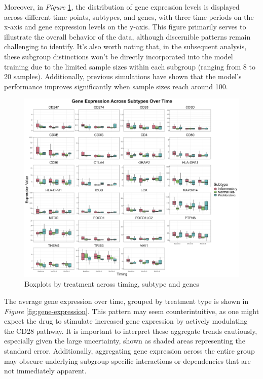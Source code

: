 \documentclass{report}
\begin{document}
Moreover, in \textit{Figure} \ref{fig:data-behaviour}, the distribution of gene expression levels is displayed across different time points, subtypes, and genes, with three time periods on the x-axis and gene expression levels on the y-axis. This figure primarily serves to illustrate the overall behavior of the data, although discernible patterns remain challenging to identify. It’s also worth noting that, in the subsequent analysis, these subgroup distinctions won’t be directly incorporated into the model training due to the limited sample sizes within each subgroup (ranging from 8 to 20 samples). Additionally, previous simulations have shown that the model’s performance improves significantly when sample sizes reach around 100. 

\begin{figure}[ht] 
	\centering
	\includegraphics[width=1.15\textwidth]{Figures/Application/descriptive_statistics/overall_boxes.png}
	\caption{Boxplots by treatment across timing, subtype and genes}
	\label{fig:data-behaviour}
\end{figure}

The average gene expression over time, grouped by treatment type is shown in \textit{Figure} \ref{fig:gene-expression}. This pattern may seem counterintuitive, as one might expect the drug to stimulate increased gene expression by actively modulating the CD28 pathway.
It is important to interpret these aggregate trends cautiously, especially given the large uncertainty, shown as shaded areas representing the standard error. Additionally, aggregating gene expression across the entire group may obscure underlying subgroup-specific interactions or dependencies that are not immediately apparent.
\end{document}
